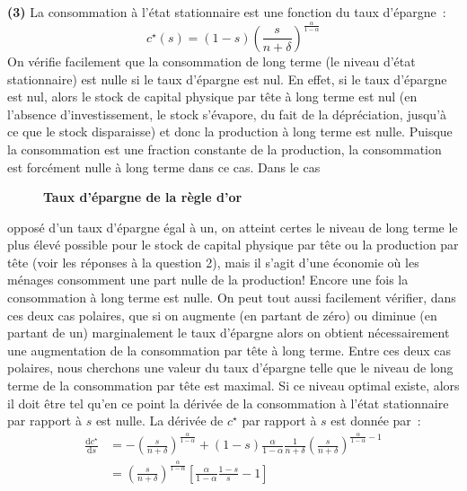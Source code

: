 \documentclass[10pt,a4paper,notitlepage]{report}
\newcommand{\question}[1]{\textbf{(#1)}}
\begin{document}
\question{3} La consommation à l'état stationnaire est une fonction du taux d'épargne :
\[
c^{\star}(s) = (1-s)\left(\frac{s}{n+\delta}\right)^{\frac{\alpha}{1-\alpha}}
\]
On vérifie  facilement que  la consommation de  long terme  (le niveau
d'état stationnaire) est nulle si le taux d'épargne est nul. En effet,
si le taux  d'épargne est nul, alors le stock  de capital physique par
tête à  long terme  est nul (en  l'absence d'investissement,  le stock
s'évapore,  du  fait de  la  dépréciation,  jusqu'à  ce que  le  stock
disparaisse) et donc la production à  long terme est nulle. Puisque la
consommation  est   une  fraction  constante  de   la  production,  la
consommation est forcément nulle à long terme dans ce cas. Dans le cas
\begin{wrapfigure}{r}{0.5\textwidth}
  \begin{center}
    
  \end{center}
  \vspace{-20pt}
  \caption{\textbf{Taux d'épargne de la règle d'or}}
  \vspace{-10pt}
\end{wrapfigure}
opposé d'un taux  d'épargne égal à un, on atteint  certes le niveau de
long terme  le plus élevé possible  pour le stock de  capital physique
par tête  ou la production par  tête (voir les réponses  à la question
2), mais il  s'agit d'une économie où les ménages  consomment une part
nulle de la  production! Encore une fois la consommation  à long terme
est nulle. On  peut tout aussi facilement vérifier, dans  ces deux cas
polaires,  que si  on augmente  (en partant  de zéro)  ou diminue  (en
partant  de  un) marginalement  le  taux  d'épargne alors  on  obtient
nécessairement une  augmentation de  la consommation  par tête  à long
terme. Entre ces deux cas polaires,  nous cherchons une valeur du taux
d'épargne telle  que le niveau  de long  terme de la  consommation par
tête est maximal. Si ce niveau  optimal existe, alors il doit être tel
qu'en ce point la dérivée de la consommation à l'état stationnaire par
rapport à $s$  est nulle. La dérivée de $c^{\star}$  par rapport à $s$
est donnée par :
\[
\begin{split}
\frac{\mathrm dc^{\star}}{\mathrm d s} &= -\left(\frac{s}{n+\delta}\right)^{\frac{\alpha}{1-\alpha}}
+ (1-s)\frac{\alpha}{1-\alpha}\frac{1}{n+\delta}\left(\frac{s}{n+\delta}\right)^{\frac{\alpha}{1-\alpha}-1}\\  
&= \left(\frac{s}{n+\delta}\right)^{\frac{\alpha}{1-\alpha}}
\left[\frac{\alpha}{1-\alpha}\frac{1-s}{s}-1\right]
\end{split}
\]
\end{document}
